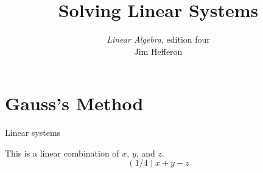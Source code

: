 \usepackage{linalgjh}
\usepackage{present}
\usepackage{directories} %
\usepackage{xr}
  
\usepackage{catchfilebetweentags}
\usepackage{etoolbox} %
\makeatletter
\patchcmd{\CatchFBT@Fin@l}{\endlinechar\m@ne}{}
  {}{}
\makeatother

{
}
\hypersetup{colorlinks=true,linkcolor=blue} 

\title[Solving Linear Systems] %
{Solving Linear Systems}

\author{\textit{Linear Algebra}, edition four \\ {\small Jim Hef{}feron}}
\date{}


\subject{Solving Linear Systems}



\begin{frame}
  \titlepage
  
\end{frame}




\section{Gauss's Method}
\begin{frame}{Linear systems} 

\ex This is a linear combination of $x$, $y$, and $z$.
\begin{equation*}
   (1/4)x+y-z
\end{equation*}
\end{frame}


